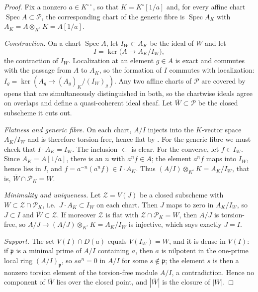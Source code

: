 \begin{proof}
Fix a nonzero $a\in K^{\circ\circ}$, so that $K=K^\circ[1/a]$ and, for
every affine chart $\operatorname{Spec}A\subset\mathcal P$, the
corresponding chart of the generic fibre is
$\operatorname{Spec}A_K$ with $A_K=A\otimes_{K^\circ}K=A[1/a]$.

\emph{Construction.}  On a chart $\operatorname{Spec}A$, let
$I_W\subset A_K$ be the ideal of $W$ and let
\[
             I=\ker\bigl(A\longrightarrow A_K/I_W\bigr),
\]
the contraction of $I_W$.  Localization at an element $g\in A$ is exact and
commutes with the passage from $A$ to $A_K$, so the formation of $I$
commutes with localization: $I_g=\ker(A_g\to (A_g)_K/(I_W)_g)$.  Any two
affine charts of $\mathcal P$ are covered by opens that are simultaneously
distinguished in both, so the chartwise ideals agree on overlaps and define
a quasi-coherent ideal sheaf.  Let $\overline W\subset\mathcal P$ be the
closed subscheme it cuts out.

\emph{Flatness and generic fibre.}  On each chart, $A/I$ injects into the
$K$-vector space $A_K/I_W$ and is therefore torsion-free, hence flat by
.  For the generic fibre we must
check that $I\cdot A_K=I_W$.  The inclusion $\subset$ is clear.  For the
converse, let $f\in I_W$.  Since $A_K=A[1/a]$, there is an $n$ with
$a^nf\in A$; the element $a^nf$ maps into $I_W$, hence lies in $I$, and
$f=a^{-n}(a^nf)\in I\cdot A_K$.  Thus
$(A/I)\otimes_{K^\circ}K=A_K/I_W$, that is,
$\overline W\cap\mathcal P_K=W$.

\emph{Minimality and uniqueness.}  Let $\mathcal Z=V(J)$ be a closed
subscheme with $W\subset\mathcal Z\cap\mathcal P_K$, i.e.\
$J\cdot A_K\subset I_W$ on each chart.  Then $J$ maps to zero in
$A_K/I_W$, so $J\subset I$ and $\overline W\subset\mathcal Z$.  If
moreover $\mathcal Z$ is flat with $\mathcal Z\cap\mathcal P_K=W$, then
$A/J$ is torsion-free, so $A/J\to(A/J)\otimes_{K^\circ}K=A_K/I_W$ is
injective, which says exactly $J=I$.

\emph{Support.}  The set $V(I)\cap D(a)$ equals $V(I_W)=W$, and it is
dense in $V(I)$: if $\mathfrak p$ is a minimal prime of $A/I$ containing
$a$, then $a$ is nilpotent in the one-prime local ring $(A/I)_{\mathfrak
p}$, so $sa^n=0$ in $A/I$ for some $s\notin\mathfrak p$; the element $s$ is
then a nonzero torsion element of the torsion-free module $A/I$, a
contradiction.  Hence no component of $\overline W$ lies over the closed
point, and $|\overline W|$ is the closure of $|W|$.
\end{proof}

